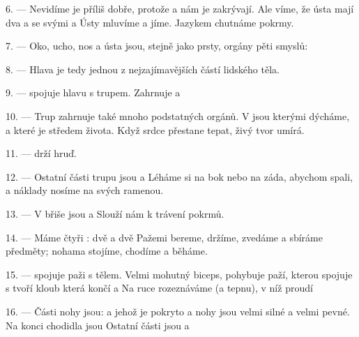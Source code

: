 6. --- Nevidíme je příliš dobře, protože  a  nám je zakrývají.
Ale víme, že ústa mají dva   a
 se svými  a  Ústy mluvíme a jíme.
Jazykem chutnáme pokrmy.

7. --- Oko, ucho, nos a ústa jsou, stejně jako prsty, orgány pěti smyslů:
    

8. --- Hlava je tedy jednou z nejzajímavějších částí lidského těla.

\VUsaut{4.4mm}
\VUsaut{3.0mm}

9. ---  spojuje hlavu s trupem. Zahrnuje  a 

10. --- Trup zahrnuje také mnoho podstatných orgánů. V  jsou
 kterými dýcháme, a  které je středem života. Když
srdce přestane tepat, živý tvor umírá.

11. ---  drží hruď.

12. --- Ostatní části trupu jsou    a
 Léháme si na bok nebo na záda, abychom spali, a náklady nosíme na
svých ramenou.

13. --- V břiše jsou  a  Slouží nám k trávení pokrmů.

\VUsaut{4.4mm}
\VUsaut{3.0mm}

14. --- Máme čtyři : dvě  a dvě  Pažemi bereme, držíme,
zvedáme a sbíráme předměty; nohama stojíme, chodíme a běháme.

15. ---  spojuje paži s tělem. Velmi mohutný  biceps, pohybuje
paží, kterou  spojuje s   tvoří kloub
 která končí  a  Na ruce rozeznáváme 
(a tepnu), v níž proudí 

16. --- Části nohy jsou:   a 
 jehož  je pokryto   a
  nohy jsou velmi silné a velmi pevné. Na konci
chodidla jsou  Ostatní části jsou  a

